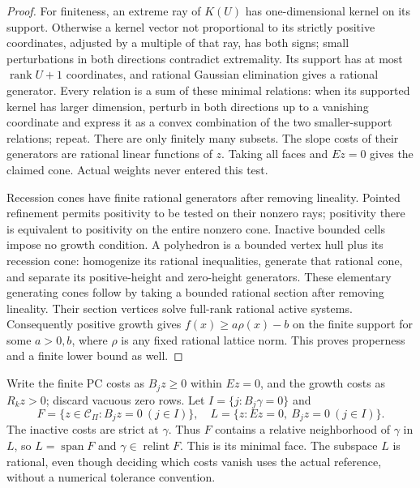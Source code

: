 \documentclass[11pt]{article}
\newcommand{\relint}{\operatorname{relint}}
\begin{document}
\begin{proof}
For finiteness, an extreme ray of $K(U)$ has one-dimensional kernel
on its support. Otherwise a kernel vector not proportional to its
strictly positive coordinates, adjusted by a multiple of that ray,
has both signs; small perturbations in both directions contradict
extremality. Its support has at most $\operatorname{rank}U+1$
coordinates, and rational Gaussian elimination gives a rational
generator. Every relation is a sum of these minimal relations:
when its supported kernel has larger dimension, perturb in both
directions up to a vanishing coordinate and express it as a convex
combination of the two smaller-support relations; repeat. There are
only finitely many subsets. The slope costs of their generators
are rational linear functions of $z$. Taking all faces and $Ez=0$
gives the claimed cone. Actual weights never entered this test.

Recession cones have finite rational generators after removing
lineality. Pointed refinement permits positivity to be tested on
their nonzero rays; positivity there is equivalent to positivity
on the entire nonzero cone. Inactive bounded cells impose no growth
condition. A polyhedron is a bounded vertex hull plus its recession
cone: homogenize its rational inequalities, generate that rational
cone, and separate its positive-height and zero-height generators.
These elementary generating cones follow by taking a bounded
rational section after removing lineality. Their section vertices
solve full-rank rational active systems. Consequently positive
growth gives $f(x)\geq a\rho(x)-b$ on the finite support for some
$a>0,b$, where $\rho$ is any fixed rational lattice norm. This proves
properness and a finite lower bound as well.
\end{proof}

Write the finite PC costs as $B_jz\geq0$ within $Ez=0$, and the
growth costs as $R_kz>0$; discard vacuous zero rows. Let
$I=\{j:B_j\gamma=0\}$ and
\[
 F=\{z\in\mathcal C_\Pi:B_jz=0\ (j\in I)\},\quad
 L=\{z:Ez=0,\ B_jz=0\ (j\in I)\}.
\]
The inactive costs are strict at $\gamma$. Thus $F$ contains a relative
neighborhood of $\gamma$ in $L$, so $L=\operatorname{span}F$ and
$\gamma\in\relint F$. This is its minimal face. The subspace $L$
is rational, even though deciding which costs vanish uses the actual
reference, without a numerical tolerance convention.
\end{document}
